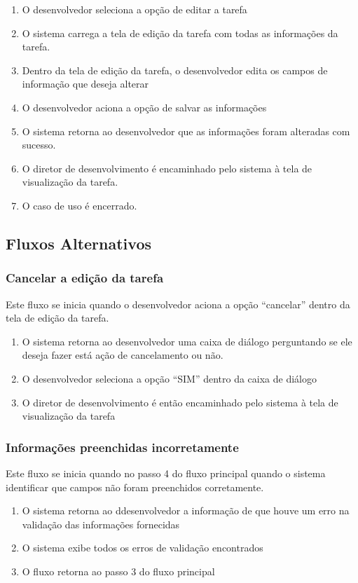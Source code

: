 \begin{enumerate}
  \item O desenvolvedor seleciona a opção de editar a tarefa
  \item O sistema carrega a tela de edição da tarefa com todas as informações da tarefa.
  \item Dentro da tela de edição da tarefa, o desenvolvedor edita os campos de informação que deseja alterar
  \item O desenvolvedor aciona a opção de salvar as informações
  \item O sistema retorna ao desenvolvedor que as informações foram alteradas com sucesso.
  \item O diretor de desenvolvimento é encaminhado pelo sistema à tela de visualização da tarefa.
  \item O caso de uso é encerrado.
\end{enumerate}

\subsection{Fluxos Alternativos}

\subsubsection{Cancelar a edição da tarefa}
Este fluxo se inicia quando o desenvolvedor aciona a opção “cancelar” dentro da tela de edição da tarefa.

\begin{enumerate}
  \item O sistema retorna ao desenvolvedor uma caixa de diálogo perguntando se ele deseja fazer está ação de cancelamento ou não.
  \item O desenvolvedor seleciona a opção “SIM” dentro da caixa de diálogo
  \item O diretor de desenvolvimento é então encaminhado pelo sistema à tela de visualização da tarefa 
\end{enumerate}

\subsubsection{Informações preenchidas incorretamente}
Este fluxo se inicia quando no passo 4 do fluxo principal quando o sistema identificar que campos não foram preenchidos corretamente.

\begin{enumerate}
  \item O sistema retorna ao ddesenvolvedor a informação de que houve um erro na validação das informações fornecidas
  \item O sistema exibe todos os erros de validação encontrados
  \item O fluxo retorna ao passo 3 do fluxo principal
\end{enumerate}


